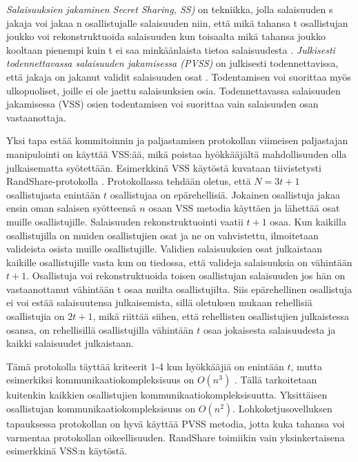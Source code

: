 \textit{Salaisuuksien jakaminen Secret Sharing, SS)} on tekniikka, jolla salaisuuden s jakaja voi jakaa n osallistujalle salaisuuden niin, että mikä tahansa t osallistujan joukko voi rekonstruktuoida salaisuuden kun toisaalta mikä tahansa joukko kooltaan pienempi kuin t ei saa minkäänlaista tietoa salaisuudesta \cite{shamir_how_1979}. \textit{Julkisesti todennettavassa salaisuuden jakamisessa (PVSS)} on julkisesti todennettavissa, että jakaja on jakanut validit salaisuuden osat \cite{StadlerMarkus2001PVSS}. Todentamisen voi suorittaa myös ulkopuoliset, joille ei ole jaettu salaisuuksien osia. Todennettavassa salaisuuden jakamisessa (VSS) osien todentamisen voi suorittaa vain salaisuuden osan vastaanottaja.

Yksi tapa estää kommitoinnin ja paljastamisen protokollan viimeisen paljastajan manipulointi on käyttää VSS:ää, mikä poistaa hyökkääjältä mahdollisuuden olla julkaisematta syötettään. Esimerkkinä VSS käytöstä kuvataan tiivistetysti RandShare-protokolla \cite{syta_scalable_2017}. Protokollassa tehdään oletus, että $N = 3t+1$ osallistujasta enintään $t$ osallistujaa on epärehellisiä. Jokainen osallistuja jakaa ensin oman salaisen syötteensä $n$ osaan VSS metodia käyttäen ja lähettää osat muille osallistujille. Salaisuuden rekonstruktuointi vaatii $t+1$ osaa. Kun kaikilla osallistujilla on muiden osallistujien osat ja ne on vahvistettu, ilmoitetaan valideista osista muille osallistujille. Validien salaisuuksien osat julkaistaan kaikille osallistujille vasta kun on tiedossa, että valideja salaisuuksia on vähintään $t+1$. Osallistuja voi rekonstruktuoida toisen osallistujan salaisuuden jos hän on vastaanottanut vähintään t osaa muilta osallistujilta. Siis epärehellinen osallistuja ei voi estää salaisuutensa julkaisemista, sillä oletuksen mukaan rehellisiä osallistujia on $2t+1$, mikä riittää siihen, että rehellisten osallistujien julkaistessa osansa, on rehellisillä osallistujilla vähintään $t$ osaa jokaisesta salaisuudesta ja kaikki salaisuudet julkaistaan. 

Tämä protokolla täyttää kriteerit 1-4 kun hyökkääjiä on enintään $t$, mutta esimerkiksi kommunikaatiokompleksisuus on $O(n^3)$ \cite{syta_scalable_2017}. Tällä tarkoitetaan kuitenkin kaikkien osallistujien kommunikaatiokompleksisuutta. Yksittäisen osallistujan kommunikaatiokompleksisuus on $O(n^2)$. Lohkoketjusovelluksen tapauksessa protokollan on hyvä käyttää PVSS metodia, jotta kuka tahansa voi varmentaa protokollan oikeellisuuden. RandShare toimiikin vain yksinkertaisena esimerkkinä VSS:n käytöstä. 

